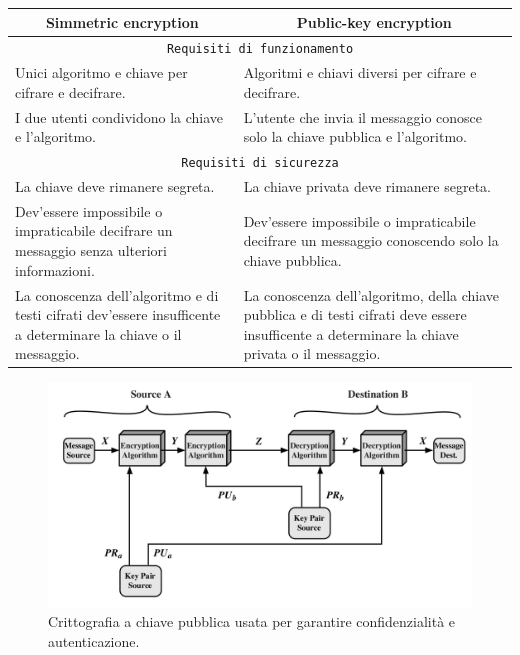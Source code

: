 \documentclass[a4paper, 11pt, twoside, openright, fleqn]{report}
\begin{document}
\begin{table}[htp]
	\renewcommand{\arraystretch}{1.3}
	\begin{tabularx}{\linewidth}{X|X}
		\toprule
		\multicolumn{1}{c|}{\textbf{Simmetric encryption}} & \multicolumn{1}{c}{\textbf{Public-key encryption}}\\
		\toprule
		\multicolumn{2}{c}{\texttt{Requisiti di funzionamento}}\\
		Unici algoritmo e chiave per cifrare e decifrare. & Algoritmi e chiavi diversi per cifrare e decifrare.\\
		I due utenti condividono la chiave e l'algoritmo. & L'utente che invia il messaggio conosce solo la chiave pubblica e l'algoritmo.\\
		\multicolumn{2}{c}{\texttt{Requisiti di sicurezza}}\\
		La chiave deve rimanere segreta. & La chiave privata deve rimanere segreta.\\
		Dev'essere impossibile o impraticabile decifrare un messaggio senza ulteriori informazioni. & Dev'essere impossibile o impraticabile decifrare un messaggio conoscendo solo la chiave pubblica.\\
		La conoscenza dell'algoritmo e di testi cifrati dev'essere insufficente a determinare la chiave o il messaggio. & La conoscenza dell'algoritmo, della chiave pubblica e di testi cifrati deve essere insufficente a determinare la chiave privata o il messaggio.\\
		\bottomrule
	\end{tabularx}
\end{table}

\begin{figure}[htp]
	\centering
	\includegraphics[width=\textwidth]{images/PublicKey}
	\captionsetup{format=hang,width=.8\textwidth}
	\caption{Crittografia a chiave pubblica usata per garantire confidenzialità e autenticazione.}
\end{figure}
\end{document}
